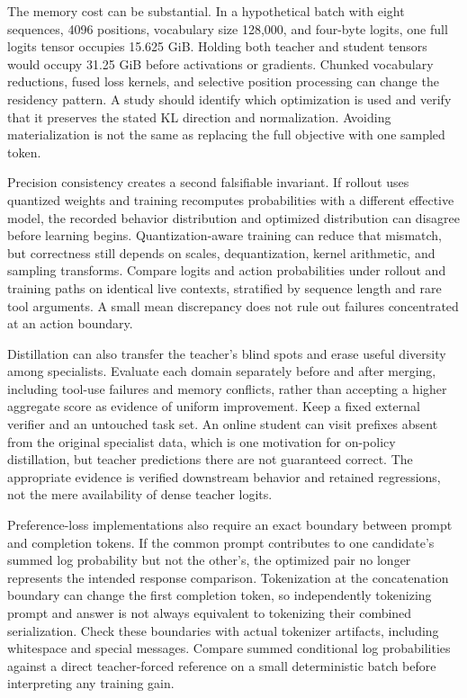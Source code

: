 The memory cost can be substantial. In a hypothetical batch with eight sequences, 4096 positions, vocabulary size 128,000, and four-byte logits, one full logits tensor occupies 15.625 GiB. Holding both teacher and student tensors would occupy 31.25 GiB before activations or gradients. Chunked vocabulary reductions, fused loss kernels, and selective position processing can change the residency pattern. A study should identify which optimization is used and verify that it preserves the stated KL direction and normalization. Avoiding materialization is not the same as replacing the full objective with one sampled token.

Precision consistency creates a second falsifiable invariant. If rollout uses quantized weights and training recomputes probabilities with a different effective model, the recorded behavior distribution and optimized distribution can disagree before learning begins. Quantization-aware training can reduce that mismatch, but correctness still depends on scales, dequantization, kernel arithmetic, and sampling transforms. Compare logits and action probabilities under rollout and training paths on identical live contexts, stratified by sequence length and rare tool arguments. A small mean discrepancy does not rule out failures concentrated at an action boundary.

Distillation can also transfer the teacher's blind spots and erase useful diversity among specialists. Evaluate each domain separately before and after merging, including tool-use failures and memory conflicts, rather than accepting a higher aggregate score as evidence of uniform improvement. Keep a fixed external verifier and an untouched task set. An online student can visit prefixes absent from the original specialist data, which is one motivation for on-policy distillation, but teacher predictions there are not guaranteed correct. The appropriate evidence is verified downstream behavior and retained regressions, not the mere availability of dense teacher logits.

Preference-loss implementations also require an exact boundary between prompt and completion tokens. If the common prompt contributes to one candidate's summed log probability but not the other's, the optimized pair no longer represents the intended response comparison. Tokenization at the concatenation boundary can change the first completion token, so independently tokenizing prompt and answer is not always equivalent to tokenizing their combined serialization. Check these boundaries with actual tokenizer artifacts, including whitespace and special messages. Compare summed conditional log probabilities against a direct teacher-forced reference on a small deterministic batch before interpreting any training gain.

